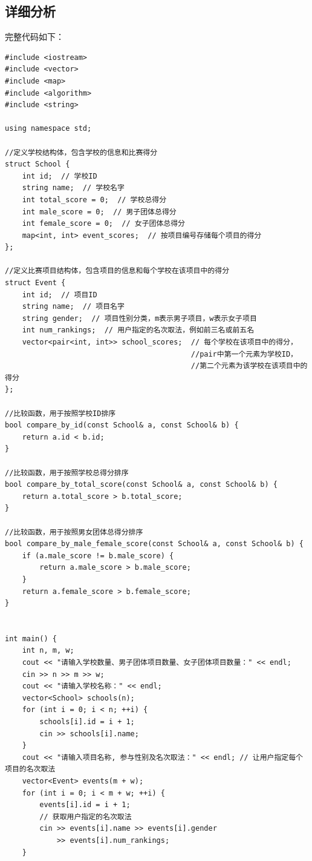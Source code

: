 \documentclass[UTF8,titlepage]{ctexart}
\numberwithin{figure}{section}
\begin{document}
\subsection{详细分析}
完整代码如下：
\begin{verbatim}
#include <iostream>
#include <vector>
#include <map>
#include <algorithm>
#include <string>

using namespace std;

//定义学校结构体，包含学校的信息和比赛得分
struct School {
    int id;  // 学校ID
    string name;  // 学校名字
    int total_score = 0;  // 学校总得分
    int male_score = 0;  // 男子团体总得分
    int female_score = 0;  // 女子团体总得分
    map<int, int> event_scores;  // 按项目编号存储每个项目的得分
};

//定义比赛项目结构体，包含项目的信息和每个学校在该项目中的得分
struct Event {
    int id;  // 项目ID
    string name;  // 项目名字
    string gender;  // 项目性别分类，m表示男子项目，w表示女子项目
    int num_rankings;  // 用户指定的名次取法，例如前三名或前五名
    vector<pair<int, int>> school_scores;  // 每个学校在该项目中的得分，
                                           //pair中第一个元素为学校ID，
                                           //第二个元素为该学校在该项目中的得分
};

//比较函数，用于按照学校ID排序
bool compare_by_id(const School& a, const School& b) {
    return a.id < b.id;
}

//比较函数，用于按照学校总得分排序
bool compare_by_total_score(const School& a, const School& b) {
    return a.total_score > b.total_score;
}

//比较函数，用于按照男女团体总得分排序
bool compare_by_male_female_score(const School& a, const School& b) {
    if (a.male_score != b.male_score) {
        return a.male_score > b.male_score;
    }
    return a.female_score > b.female_score;
}


int main() {
    int n, m, w;
    cout << "请输入学校数量、男子团体项目数量、女子团体项目数量：" << endl;
    cin >> n >> m >> w;
    cout << "请输入学校名称：" << endl;
    vector<School> schools(n);
    for (int i = 0; i < n; ++i) {
        schools[i].id = i + 1;
        cin >> schools[i].name;
    }
    cout << "请输入项目名称, 参与性别及名次取法：" << endl; // 让用户指定每个项目的名次取法
    vector<Event> events(m + w);
    for (int i = 0; i < m + w; ++i) {
        events[i].id = i + 1;
        // 获取用户指定的名次取法
        cin >> events[i].name >> events[i].gender 
            >> events[i].num_rankings; 
    }


\end{verbatim}
\end{document}
